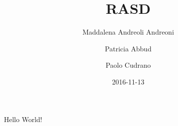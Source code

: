 \documentclass{report}
\title{RASD}
\date{2016-11-13}
\author{
	Maddalena Andreoli Andreoni
	\and
	Patricia Abbud
	\and
	Paolo Cudrano
}
\begin{document}
	\maketitle
  \newpage
	Hello World!
\end{document}
